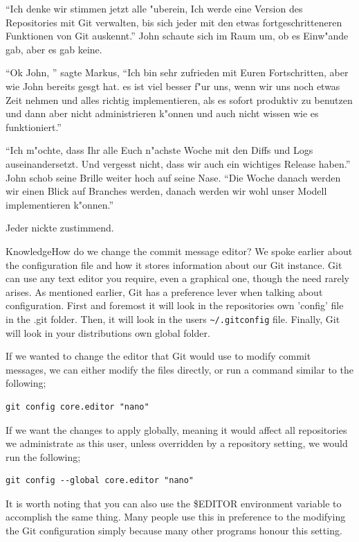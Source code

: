 \begin{trenches}
``Ich denke wir stimmen jetzt alle "uberein, Ich werde eine Version des Repositories mit Git verwalten, bis sich jeder mit den etwas fortgeschritteneren Funktionen von Git auskennt.'' John schaute sich im Raum um, ob es Einw"ande gab, aber es gab keine.

``Ok John, '' sagte Markus, ``Ich bin sehr zufrieden mit Euren Fortschritten, aber wie John bereits gesgt hat. es ist viel besser f"ur uns, wenn wir uns noch etwas Zeit nehmen und alles richtig implementieren, als es sofort produktiv zu benutzen und dann aber nicht administrieren k"onnen und auch nicht wissen wie es funktioniert.''

``Ich m"ochte, dass Ihr alle Euch n"achste Woche mit den Diffs und Logs auseinandersetzt. Und vergesst nicht, dass wir auch ein wichtiges Release haben.'' John
schob seine Brille weiter hoch auf seine Nase. ``Die Woche danach werden wir einen Blick auf Branches werden, danach werden wir wohl unser Modell implementieren
k"onnen.''

Jeder nickte zustimmend.
\end{trenches}

\begin{callout}{Knowledge}{How do we change the commit message editor?}
We spoke earlier about the configuration file and how it stores information about our Git instance.  Git can use any text editor you require, even a graphical one, though the need rarely arises.  As mentioned earlier, Git has a preference lever when talking about configuration.  First and foremost it will look in the repositories own 'config' file in the .git folder.  Then, it will look in the users \texttt{\textasciitilde/.gitconfig} file.  Finally, Git will look in your distributions own global folder.  

If we wanted to change the editor that Git would use to modify commit messages, we can either modify the files directly, or run a command similar to the following;

\begin{Verbatim}
git config core.editor "nano"
\end{Verbatim}

If we want the changes to apply globally, meaning it would affect all repositories we administrate as this user, unless overridden by a repository setting, we would run the following;

\begin{Verbatim}
git config --global core.editor "nano"
\end{Verbatim}

It is worth noting that you can also use the \$EDITOR environment variable to accomplish the same thing.  Many people use this in preference to the modifying the Git configuration simply because many other programs honour this setting.
\end{callout}

